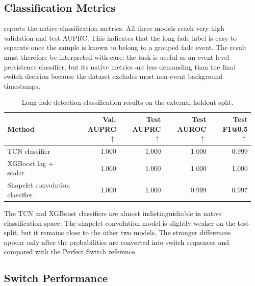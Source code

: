 \subsection{Classification Metrics}
\label{sec:results-long-fade-classification}

 reports the native classification
metrics. All three models reach very high validation and test AUPRC. This
indicates that the long-fade label is easy to separate once the sample is known
to belong to a grouped fade event. The result must therefore be interpreted with
care: the task is useful as an event-level persistence classifier, but its
native metrics are less demanding than the final switch decision because the
dataset excludes most non-event background timestamps.

\begin{table}[htbp]
  \centering
  \caption{Long-fade detection classification results on the external holdout split.}
  \label{tab:long-fade-classification-results}
  \small
  \setlength{\tabcolsep}{4pt}
  \renewcommand{\arraystretch}{1.15}
  \begin{tabular}{
    @{}
    >{\raggedright\arraybackslash}p{}
    rrrr
    @{}
  }
    \toprule
    Method
      & \shortstack{Val. AUPRC\\\(\uparrow\)}
      & \shortstack{Test AUPRC\\\(\uparrow\)}
      & \shortstack{Test AUROC\\\(\uparrow\)}
      & \shortstack{Test F1@0.5\\\(\uparrow\)} \\
    \midrule
    TCN classifier & 1.000 & 1.000 & 1.000 & 0.999 \\
    XGBoost lag + scalar & 1.000 & 1.000 & 1.000 & 1.000 \\
    Shapelet convolution classifier & 1.000 & 1.000 & 0.999 & 0.997 \\
    \bottomrule
  \end{tabular}
\end{table}

The TCN and XGBoost classifiers are almost indistinguishable in native
classification space. The shapelet convolution model is slightly weaker on the
test split, but it remains close to the other two models. The stronger
differences appear only after the probabilities are converted into switch
sequences and compared with the Perfect Switch reference.

\subsection{Switch Performance}
\label{sec:results-long-fade-switch}

